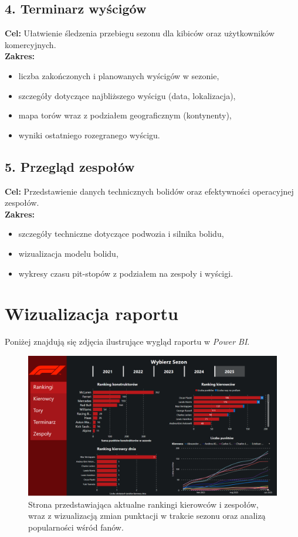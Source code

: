 \documentclass[12pt]{article}
\begin{document}
\subsection*{4. Terminarz wyścigów}

\textbf{Cel:} Ułatwienie śledzenia przebiegu sezonu dla kibiców oraz użytkowników komercyjnych.\\
\textbf{Zakres:}
\begin{itemize}
    \item liczba zakończonych i planowanych wyścigów w sezonie,
    \item szczegóły dotyczące najbliższego wyścigu (data, lokalizacja),
    \item mapa torów wraz z podziałem geograficznym (kontynenty),
    \item wyniki ostatniego rozegranego wyścigu.
\end{itemize}

\subsection*{5. Przegląd zespołów}

\textbf{Cel:} Przedstawienie danych technicznych bolidów oraz efektywności operacyjnej zespołów.\\
\textbf{Zakres:}
\begin{itemize}
    \item szczegóły techniczne dotyczące podwozia i silnika bolidu,
    \item wizualizacja modelu bolidu,
    \item wykresy czasu pit-stopów z podziałem na zespoły i wyścigi.
\end{itemize}

\section{Wizualizacja raportu}

Poniżej znajdują się zdjęcia ilustrujące wygląd raportu w \textit{Power BI}.

\begin{figure}[H]
    \centering
\includegraphics[width=\textwidth]{raport1.png}
    \caption{Strona przedstawiająca aktualne rankingi kierowców i zespołów, wraz z wizualizacją zmian punktacji w trakcie sezonu oraz analizą popularności wśród fanów.}
\end{figure}
\end{document}
